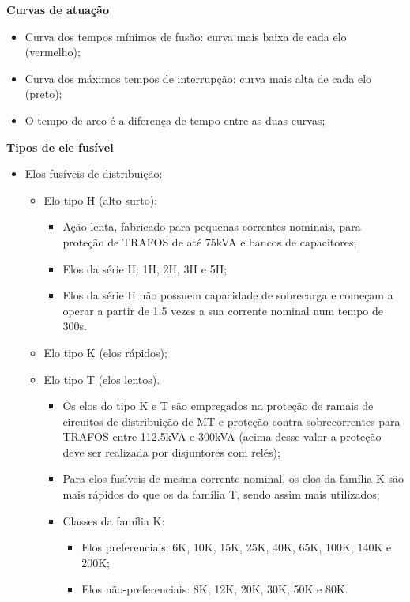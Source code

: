 \textbf{Curvas de atuação}

\begin{itemize}
    \item Curva dos tempos mínimos de fusão: curva mais baixa de cada elo (vermelho);
    \item Curva dos máximos tempos de interrupção: curva mais alta de cada elo (preto);
    \item O tempo de arco é a diferença de tempo entre as duas curvas;
\end{itemize}

\textbf{Tipos de ele fusível}

\begin{itemize}
    \item Elos fusíveis de distribuição:
    \begin{itemize}
        \item Elo tipo H (alto surto);
        \begin{itemize}
            \item Ação lenta, fabricado para pequenas correntes nominais, para proteção de TRAFOS de até 75kVA e bancos de capacitores;
            \item Elos da série H: 1H, 2H, 3H e 5H;
            \item Elos da série H não possuem capacidade de sobrecarga e começam a operar a partir de 1.5 vezes a sua corrente nominal num tempo de 300s.
        \end{itemize}
        \item Elo tipo K (elos rápidos);
        \item Elo tipo T (elos lentos).
        \begin{itemize}
            \item Os elos do tipo K e T são empregados na proteção de ramais de circuitos de distribuição de MT e proteção contra sobrecorrentes para TRAFOS entre 112.5kVA e 300kVA (acima desse valor a proteção deve ser realizada por disjuntores com relés);
            \item Para elos fusíveis de mesma corrente nominal, os elos da família K são mais rápidos do que os da família T, sendo assim mais utilizados;
            \item Classes da família K:
            \begin{itemize}
                \item Elos preferenciais: 6K, 10K, 15K, 25K, 40K, 65K, 100K, 140K e 200K;
                \item Elos não-preferenciais: 8K, 12K, 20K, 30K, 50K e 80K. 

\end{itemize}
\end{itemize}
\end{itemize}
\end{itemize}
